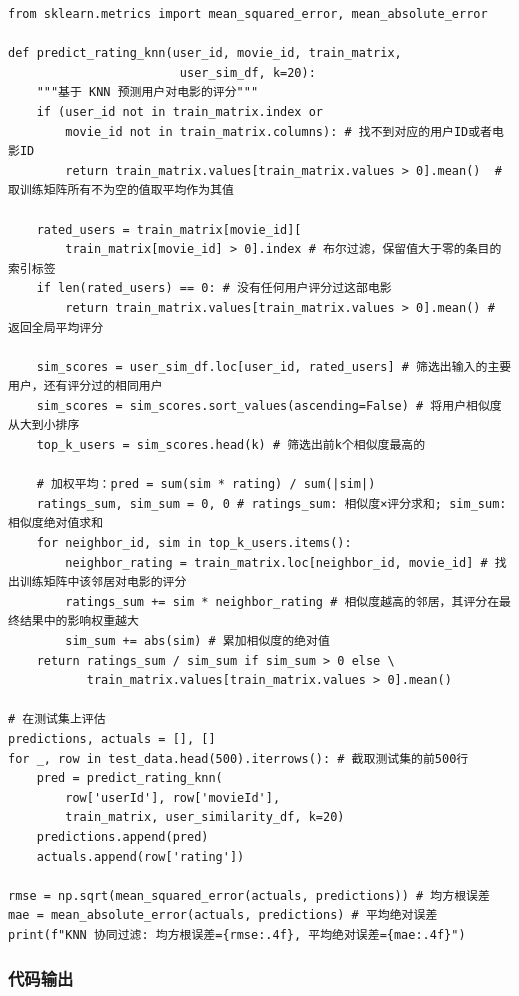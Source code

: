 \documentclass[12pt,a4paper]{ctexart}
\begin{document}
\begin{lstlisting}[caption={KNN 评分预测与评估}, label={lst:2-2}]
from sklearn.metrics import mean_squared_error, mean_absolute_error

def predict_rating_knn(user_id, movie_id, train_matrix,
                        user_sim_df, k=20):
    """基于 KNN 预测用户对电影的评分"""
    if (user_id not in train_matrix.index or
        movie_id not in train_matrix.columns): # 找不到对应的用户ID或者电影ID
        return train_matrix.values[train_matrix.values > 0].mean()  # 取训练矩阵所有不为空的值取平均作为其值

    rated_users = train_matrix[movie_id][
        train_matrix[movie_id] > 0].index # 布尔过滤，保留值大于零的条目的索引标签
    if len(rated_users) == 0: # 没有任何用户评分过这部电影
        return train_matrix.values[train_matrix.values > 0].mean() # 返回全局平均评分

    sim_scores = user_sim_df.loc[user_id, rated_users] # 筛选出输入的主要用户，还有评分过的相同用户
    sim_scores = sim_scores.sort_values(ascending=False) # 将用户相似度从大到小排序
    top_k_users = sim_scores.head(k) # 筛选出前k个相似度最高的

    # 加权平均：pred = sum(sim * rating) / sum(|sim|)
    ratings_sum, sim_sum = 0, 0 # ratings_sum: 相似度×评分求和; sim_sum: 相似度绝对值求和
    for neighbor_id, sim in top_k_users.items():
        neighbor_rating = train_matrix.loc[neighbor_id, movie_id] # 找出训练矩阵中该邻居对电影的评分
        ratings_sum += sim * neighbor_rating # 相似度越高的邻居，其评分在最终结果中的影响权重越大
        sim_sum += abs(sim) # 累加相似度的绝对值
    return ratings_sum / sim_sum if sim_sum > 0 else \
           train_matrix.values[train_matrix.values > 0].mean()

# 在测试集上评估
predictions, actuals = [], []
for _, row in test_data.head(500).iterrows(): # 截取测试集的前500行
    pred = predict_rating_knn(
        row['userId'], row['movieId'],
        train_matrix, user_similarity_df, k=20)
    predictions.append(pred)
    actuals.append(row['rating'])

rmse = np.sqrt(mean_squared_error(actuals, predictions)) # 均方根误差
mae = mean_absolute_error(actuals, predictions) # 平均绝对误差
print(f"KNN 协同过滤: 均方根误差={rmse:.4f}, 平均绝对误差={mae:.4f}")
\end{lstlisting}

\subsubsection{代码输出}
\end{document}
